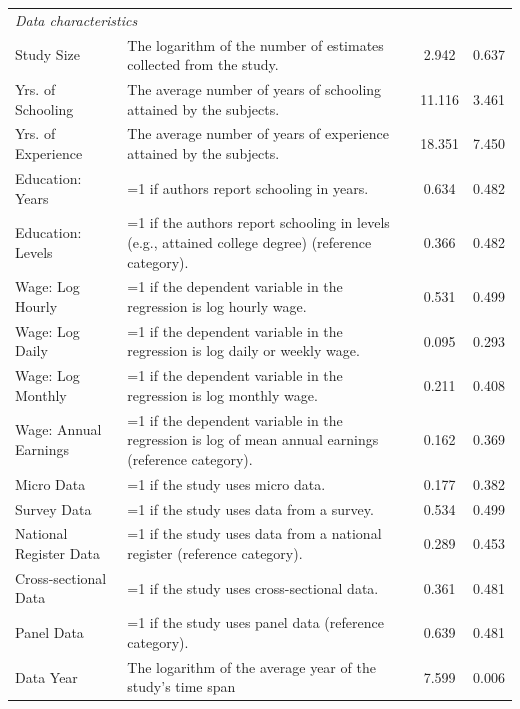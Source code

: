 \begin{singlespace}
\begin{scriptsize}
\begin{longtable}{
  @{\hskip\tabcolsep\extracolsep\fill}
  l
  p{0.55\hsize}
  cc
  @{}
  }
  \multicolumn{4}{l}{\emph{Data characteristics}}\\
  Study Size & The logarithm of the number of estimates collected from the study. & 2.942 & 0.637 \\
  Yrs. of Schooling & The average number of years of schooling attained by the subjects. & 11.116 & 3.461 \\
  Yrs. of Experience & The average number of years of experience attained by the subjects. & 18.351 & 7.450 \\
  Education: Years & =1 if authors report schooling in years. & 0.634 & 0.482 \\
  Education: Levels & =1 if the authors report schooling in levels (e.g., attained college degree) (reference category). & 0.366 & 0.482 \\
  Wage: Log Hourly & =1 if the dependent variable in the regression is log hourly wage. & 0.531 & 0.499 \\
  Wage: Log Daily & =1 if the dependent variable in the regression is log daily or weekly wage. & 0.095 & 0.293 \\
  Wage: Log Monthly & =1 if the dependent variable in the regression is log monthly wage. & 0.211 & 0.408 \\
  Wage: Annual Earnings & =1 if the dependent variable in the regression is log of mean annual earnings (reference category). & 0.162 & 0.369 \\
  Micro Data & =1 if the study uses micro data. & 0.177 & 0.382 \\
  Survey Data & =1 if the study uses data from a survey. & 0.534 & 0.499 \\
  National Register Data & =1 if the study uses data from a national register (reference category). & 0.289 & 0.453 \\
  Cross-sectional Data & =1 if the study uses cross-sectional data. & 0.361 & 0.481 \\
  Panel Data & =1 if the study uses panel data (reference category). & 0.639 & 0.481 \\
  Data Year & The logarithm of the average year of the study's time span & 7.599 & 0.006 \\
  \midrule
  

\end{longtable}
\end{scriptsize}
\end{singlespace}

